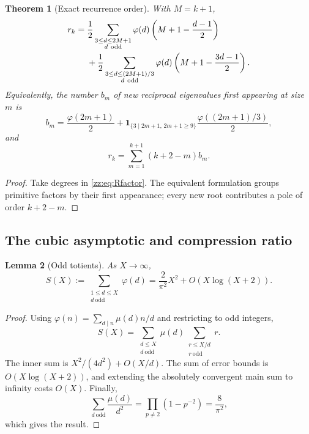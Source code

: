 \documentclass[11pt,a4paper]{article}
\newtheorem{theorem}{Theorem}[section]
\newtheorem{lemma}[theorem]{Lemma}
\theoremstyle{definition}
\begin{document}
\begin{theorem}[Exact recurrence order]
\label{zz:thm:degree}
With $M=k+1$,
\begin{align}\label{zz:eq:degree-sums}
 r_k={}&\frac12\sum_{\substack{3\le d\le2M+1\\d\ \mathrm{odd}}}
 \varphi(d)\left(M+1-\frac{d-1}{2}\right)\notag\\
 &+\frac12\sum_{\substack{3\le d\le(2M+1)/3\\d\ \mathrm{odd}}}
 \varphi(d)\left(M+1-\frac{3d-1}{2}\right).
\end{align}
Equivalently, the number $b_m$ of new reciprocal eigenvalues first appearing
at size $m$ is
\begin{equation}\label{zz:eq:births}
 b_m=\frac{\varphi(2m+1)}2+
 \mathbf{1}_{\{3\mid 2m+1,\,2m+1\ge9\}}
 \frac{\varphi((2m+1)/3)}2,
\end{equation}
and
\begin{equation}\label{zz:eq:degree-births}
 r_k=\sum_{m=1}^{k+1}(k+2-m)b_m.
\end{equation}
\end{theorem}
\begin{proof}
Take degrees in \eqref{zz:eq:Rfactor}.  The equivalent formulation groups
primitive factors by their first appearance; every new root contributes a
pole of order $k+2-m$.
\end{proof}

\subsection{The cubic asymptotic and compression ratio}
\begin{lemma}[Odd totients]
\label{zz:lem:totient}
As $X\to\infty$,
\[
 S(X):=\sum_{\substack{1\le d\le X\\d\ \mathrm{odd}}}\varphi(d)
 =\frac{2}{\pi^2}X^2+O(X\log(X+2)).
\]
\end{lemma}
\begin{proof}
Using $\varphi(n)=\sum_{d\mid n}\mu(d)n/d$ and restricting to odd integers,
\[
 S(X)=\sum_{\substack{d\le X\\d\ \mathrm{odd}}}\mu(d)
       \sum_{\substack{r\le X/d\\r\ \mathrm{odd}}}r.
\]
The inner sum is $X^2/(4d^2)+O(X/d)$.  The sum of error bounds is
$O(X\log(X+2))$, and extending the absolutely convergent main sum to
infinity costs $O(X)$.
Finally,
\[
 \sum_{d\ \mathrm{odd}}\frac{\mu(d)}{d^2}
 =\prod_{p\ne2}(1-p^{-2})=\frac8{\pi^2},
\]
which gives the result.
\end{proof}
\end{document}
